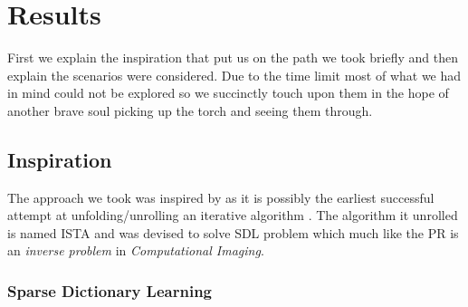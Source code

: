 \chapter{Results}

First we explain the inspiration that put us on the path we took briefly and then explain the scenarios were considered. 
Due to the time limit most of what we had in mind could not be explored so we succinctly touch upon them in the hope of another 
brave soul picking up the torch and seeing them through.  

\section{Inspiration}

The approach we took was inspired by \cite{Gregor2010} as it is possibly the earliest successful attempt at unfolding/unrolling 
an iterative algorithm \cite{Monga2019}. The algorithm it unrolled is named \ac{ISTA}\cite{Daubechies2003} and was devised to solve \ac{SDL} 
problem which much like the \ac{PR}\cite{Shechtman2015}\cite{Jaganathan2015} is an \emph{inverse problem}\cite{Kirsch2021} in \emph{Computational Imaging}.

\subsection{Sparse Dictionary Learning}

